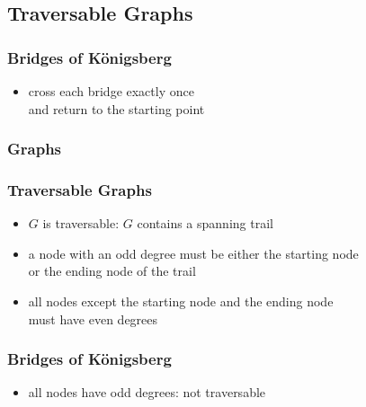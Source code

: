 \documentclass[dvipsnames]{beamer}
\begin{document}
\subsection{Traversable Graphs}

\begin{frame}
  \frametitle{Bridges of Königsberg}

  \begin{center}
  \end{center}

  \begin{itemize}
    \item cross each bridge exactly once\\
      and return to the starting point
  \end{itemize}
\end{frame}

\begin{frame}
  \frametitle{Graphs}

  \begin{center}
  \end{center}
\end{frame}

\begin{frame}
  \frametitle{Traversable Graphs}

  \begin{itemize}
    \item $G$ is \alert{traversable}: $G$ contains a spanning trail

    \medskip
    \item a node with an odd degree must be either the starting node\\
      or the ending node of the trail
    \item all nodes except the starting node and the ending node\\
      must have even degrees
  \end{itemize}
\end{frame}

\begin{frame}
  \frametitle{Bridges of Königsberg}

  \begin{center}
  \end{center}

  \begin{itemize}
    \item all nodes have odd degrees: not traversable
  \end{itemize}
\end{frame}
\end{document}

